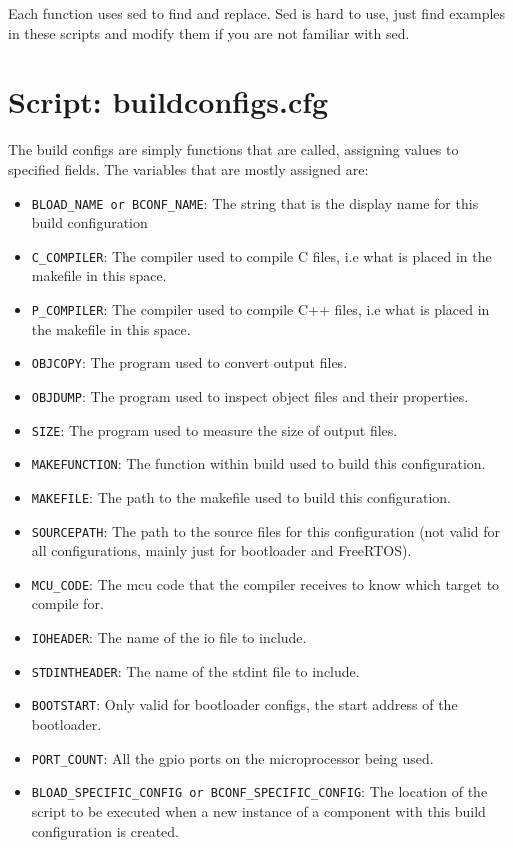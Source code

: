 \documentclass[a4paper, oneside, 11pt, titlepage, onecolumn, openright]{report}
\begin{document}
			Each function uses sed to find and replace. Sed is hard to use, just find examples in these scripts and modify them if you are not familiar with sed.
			
\section{Script: buildconfigs.cfg}
			\label{s:buildConfigs}
			The build configs are simply functions that are called, assigning values to specified fields. The variables that are mostly assigned are:
			

\begin{itemize}
\item \texttt{BLOAD\_NAME or BCONF\_NAME}: The string that is the display name for this build configuration
\item \texttt{C\_COMPILER}: The compiler used to compile C files, i.e what is placed in the makefile in this space.
\item \texttt{P\_COMPILER}: The compiler used to compile C++ files, i.e what is placed in the makefile in this space.
\item \texttt{OBJCOPY}: The program used to convert output files.
\item \texttt{OBJDUMP}: The program used to inspect object files and their properties.
\item \texttt{SIZE}: The program used to measure the size of output files.
\item \texttt{MAKEFUNCTION}: The function within build used to build this configuration.
\item \texttt{MAKEFILE}: The path to the makefile used to build this configuration.
\item \texttt{SOURCEPATH}: The path to the source files for this configuration (not valid for all configurations, mainly just for bootloader and FreeRTOS).
\item \texttt{MCU\_CODE}: The mcu code that the compiler receives to know which target to compile for.
\item \texttt{IOHEADER}: The name of the io file to include.
\item \texttt{STDINTHEADER}: The name of the stdint file to include.
\item \texttt{BOOTSTART}: Only valid for bootloader configs, the start address of the bootloader.
\item \texttt{PORT\_COUNT}: All the gpio ports on the microprocessor being used.
\item \texttt{BLOAD\_SPECIFIC\_CONFIG or BCONF\_SPECIFIC\_CONFIG}: The location of the script to be executed when a new instance of a component with this build configuration is created.

\end{itemize}
\end{document}
